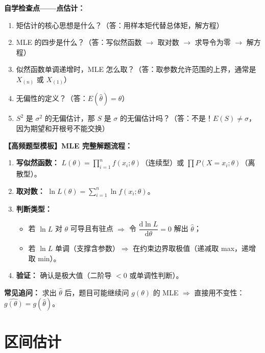 ﻿\documentclass[lang=cn,11pt]{elegantbook}
\begin{document}
\begin{note}
\textbf{自学检查点——点估计：}
\begin{enumerate}
    \item 矩估计的核心思想是什么？（答：用样本矩代替总体矩，解方程）
    \item MLE 的四步是什么？（答：写似然函数 $\to$ 取对数 $\to$ 求导令为零 $\to$ 解方程）
    \item 似然函数单调递增时，MLE 怎么取？（答：取参数允许范围的上界，通常是 $X_{(n)}$ 或 $X_{(1)}$）
    \item 无偏性的定义？（答：$E(\hat\theta)=\theta$）
    \item $S^2$ 是 $\sigma^2$ 的无偏估计，那 $S$ 是 $\sigma$ 的无偏估计吗？（答：不是！$E(S)\neq\sigma$，因为期望和开根号不能交换）
\end{enumerate}
\end{note}


\begin{note}
\textbf{【高频题型模板】MLE 完整解题流程：}
\begin{enumerate}
    \item \textbf{写似然函数：} $L(\theta)=\displaystyle\prod_{i=1}^n f(x_i;\theta)$（连续型）或 $\prod P(X=x_i;\theta)$（离散型）。
    \item \textbf{取对数：} $\ln L(\theta)=\sum_{i=1}^n \ln f(x_i;\theta)$。
    \item \textbf{判断类型：}
    \begin{itemize}
        \item 若 $\ln L$ 对 $\theta$ 可导且有驻点 $\Rightarrow$ 令 $\dfrac{\mathrm{d}\ln L}{\mathrm{d}\theta}=0$ 解出 $\hat\theta$；
        \item 若 $\ln L$ 单调（支撑含参数）$\Rightarrow$ 在约束边界取极值（递减取 max，递增取 min）。
    \end{itemize}
    \item \textbf{验证：} 确认是极大值（二阶导 $<0$ 或单调性判断）。
\end{enumerate}
\textbf{常见追问：} 求出 $\hat\theta$ 后，题目可能继续问 $g(\theta)$ 的 MLE $\Rightarrow$ 直接用不变性：$\widehat{g(\theta)}=g(\hat\theta)$。
\end{note}


\chapter{区间估计}
\end{document}
